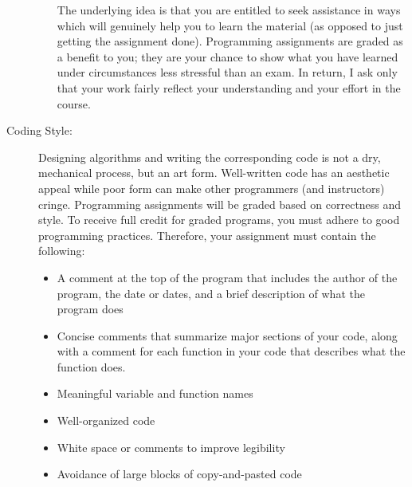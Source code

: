 \documentclass [letterpaper,11pt]{article}
\begin{document}
\begin{description}
\begin{itemize}
\begin{itemize}
                        \end{itemize}
        
        The underlying idea is that you are entitled to seek assistance in ways which will genuinely help you to learn the material (as opposed to just getting the assignment done).  Programming assignments are graded as a benefit to you;  they are your chance to show what you have learned under circumstances less stressful than an exam.  In return, I ask only that your work fairly reflect your understanding and your effort in the course.
        \end{itemize}


\item[Coding Style:]
Designing algorithms and writing the corresponding code is not a dry, mechanical process, but an art form.  Well-written code has an aesthetic appeal while poor form can make other programmers (and instructors) cringe. Programming assignments will be graded based on correctness and style. To receive full credit for graded programs, you must adhere to good programming practices. Therefore, your assignment must contain the following:
\begin{itemize}\setlength{\itemsep}{0em}\setlength{\parskip}{0pt}
	\item A comment at the top of the program that includes the author of the program,
	the date or dates, and a brief description of what the program does
	\item Concise comments that summarize major sections of your code, along with a comment
	for each function in your code that describes what the function does.
	\item Meaningful variable and function names
	\item Well-organized code
	\item White space or comments to improve legibility
	\item Avoidance of large blocks of copy-and-pasted code
\end{itemize}


\end{description}
\end{document}
